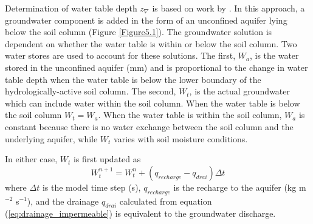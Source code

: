 \documentclass[12pt,authoryear]{elsarticle}
\numberwithin{equation}{section} %
\begin{document}
Determination of water table depth $z_{\nabla}$ is based on work by \citet{niuDevelopmentSimpleGroundwater2007}. In this approach, a groundwater component is added in the form of an unconfined aquifer lying below the soil column (Figure \ref{Figure5.1}). The groundwater solution is dependent on whether the water table is within or below the soil column. Two water stores are used to account for these solutions. The first, $W_{a}$, is the water stored in the unconfined aquifer (mm) and is proportional to the change in water table depth when the water table is below the lower boundary of the hydrologically-active soil column. The second, $W_{t}$, is the actual groundwater which can include water within the soil column. When the water table is below the soil column $W_{t} = W_{a}$. When the water table is within the soil column, $W_{a}$ is constant because there is no water exchange between the soil column and the underlying aquifer, while $W_{t}$ varies with soil moisture conditions.

In either case, $W_{t}$ is first updated as
\begin{equation}
W_{t}^{n+1} = W_{t}^{n}+(q_{recharge}-q_{drai})\Delta t
\end{equation}
where $\Delta t$ is the model time step (s), $q_{recharge}$ is the recharge to the aquifer (kg m$^{-2}$ s$^{-1}$), and the drainage $q_{drai}$ calculated from equation (\ref{eq:drainage_impermeable}) is equivalent to the groundwater discharge.
\end{document}
